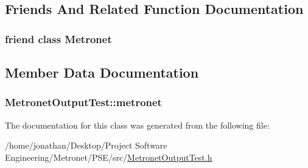 \subsection{Friends And Related Function Documentation}
\subsubsection[{\texorpdfstring{Metronet}{Metronet}}]{\setlength{\rightskip}{0pt plus 5cm}friend class {\bf Metronet}\hspace{0.3cm}{\ttfamily [friend]}}\hypertarget{class_metronet_output_test_a07c94fb69880743e62f64a941fc2d4ab}{}\label{class_metronet_output_test_a07c94fb69880743e62f64a941fc2d4ab}


\subsection{Member Data Documentation}
\subsubsection[{\texorpdfstring{metronet}{metronet}}]{ Metronet\+Output\+Test\+::metronet\hspace{0.3cm}{\ttfamily [protected]}}\hypertarget{class_metronet_output_test_aaa6f34ee762d128cd8aea8c895bb46e4}{}\label{class_metronet_output_test_aaa6f34ee762d128cd8aea8c895bb46e4}


The documentation for this class was generated from the following file\+:\begin{DoxyCompactItemize}
\item 
/home/jonathan/\+Desktop/\+Project Software Engineering/\+Metronet/\+P\+S\+E/src/\hyperlink{_metronet_output_test_8h}{Metronet\+Output\+Test.\+h}\end{DoxyCompactItemize}
